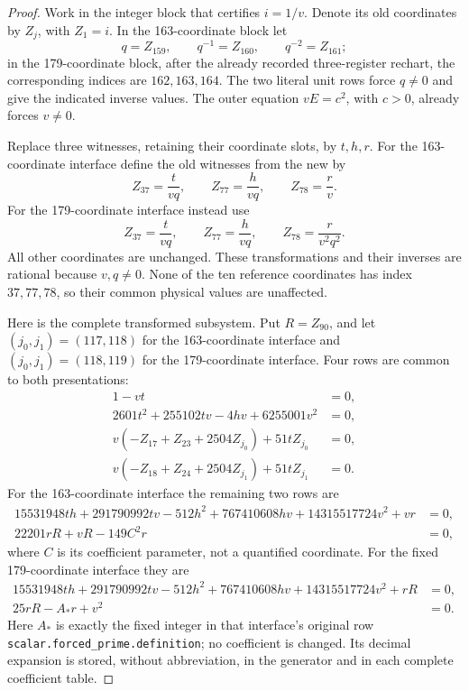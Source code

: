 \documentclass[11pt]{article}
\begin{document}
\begin{proof}
Work in the integer block that certifies \(i=1/v\).  Denote its old
coordinates by \(Z_j\), with \(Z_1=i\).  In the 163-coordinate block let
\[
       q=Z_{159},\qquad q^{-1}=Z_{160},\qquad q^{-2}=Z_{161};
\]
in the 179-coordinate block, after the already recorded three-register
rechart, the corresponding indices are \(162,163,164\).  The two literal
unit rows force \(q\ne0\) and give the indicated inverse values.  The
outer equation \(vE=c^2\), with \(c>0\), already forces \(v\ne0\).

Replace three witnesses, retaining their coordinate slots, by \(t,h,r\).
For the 163-coordinate interface define the old witnesses from the new by
\begin{equation}\label{eq:reciprocal-chart-163}
       Z_{37}=\frac{t}{vq},\qquad
       Z_{77}=\frac{h}{vq},\qquad
       Z_{78}=\frac{r}{v}.
\end{equation}
For the 179-coordinate interface instead use
\begin{equation}\label{eq:reciprocal-chart-179}
       Z_{37}=\frac{t}{vq},\qquad
       Z_{77}=\frac{h}{vq},\qquad
       Z_{78}=\frac{r}{v^2q^2}.
\end{equation}
All other coordinates are unchanged.  These transformations and their
inverses are rational because \(v,q\ne0\).  None of the ten reference
coordinates has index \(37,77,78\), so their common physical values are
unaffected.

Here is the complete transformed subsystem.  Put \(R=Z_{90}\), and let
\((j_0,j_1)=(117,118)\) for the 163-coordinate interface and
\((j_0,j_1)=(118,119)\) for the 179-coordinate interface.  Four rows are
common to both presentations:
\begin{align}
 1-vt&=0,\label{eq:reciprocal-input-unit}\\
 2601t^2+255102tv-4hv+6255001v^2&=0,\label{eq:reciprocal-pair}\\
 v(-Z_{17}+Z_{23}+2504Z_{j_0})+51tZ_{j_0}&=0,
       \label{eq:reciprocal-cleared-real}\\
 v(-Z_{18}+Z_{24}+2504Z_{j_1})+51tZ_{j_1}&=0.
       \label{eq:reciprocal-cleared-imag}
\end{align}
For the 163-coordinate interface the remaining two rows are
\begin{align}
 15531948th+291790992tv-512h^2+767410608hv
       +14315517724v^2+vr&=0,\label{eq:reciprocal-product-163}\\
 22201rR+vR-149C^2r&=0,\label{eq:reciprocal-forced-163}
\end{align}
where \(C\) is its coefficient parameter, not a quantified coordinate.
For the fixed 179-coordinate interface they are
\begin{align}
 15531948th+291790992tv-512h^2+767410608hv
       +14315517724v^2+rR&=0,\label{eq:reciprocal-product-179}\\
 25rR-A_*r+v^2&=0.\label{eq:reciprocal-forced-179}
\end{align}
Here \(A_*\) is exactly the fixed integer in that interface's original
row \nolinkurl{scalar.forced_prime.definition}; no coefficient is changed.
Its decimal expansion is stored, without abbreviation, in the generator
and in each complete coefficient table.


\end{proof}
\end{document}
